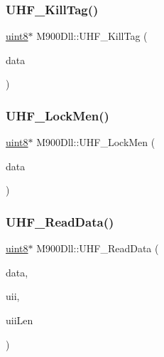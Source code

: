\subsubsection{\texorpdfstring{UHF\_KillTag()}{UHF\_KillTag()}}
{\footnotesize\ttfamily \mbox{\hyperlink{m900dll_8h_adde6aaee8457bee49c2a92621fe22b79}{uint8}}$\ast$ M900\+Dll\+::\+U\+H\+F\+\_\+\+Kill\+Tag (\begin{DoxyParamCaption}\item[{\mbox{\hyperlink{struct_u_h_f___req_kill_tag__t}{U\+H\+F\+\_\+\+Req\+Kill\+Tag\+\_\+t}} $\ast$}]{data }\end{DoxyParamCaption})}

\mbox{\label{class_m900_dll_a2966116b5f6e7a04a490d38d27251ff1}} 
\subsubsection{\texorpdfstring{UHF\_LockMen()}{UHF\_LockMen()}}
{\footnotesize\ttfamily \mbox{\hyperlink{m900dll_8h_adde6aaee8457bee49c2a92621fe22b79}{uint8}}$\ast$ M900\+Dll\+::\+U\+H\+F\+\_\+\+Lock\+Men (\begin{DoxyParamCaption}\item[{\mbox{\hyperlink{struct_u_h_f___req_lock_mem__t}{U\+H\+F\+\_\+\+Req\+Lock\+Mem\+\_\+t}} $\ast$}]{data }\end{DoxyParamCaption})}

\mbox{\label{class_m900_dll_a356133adf3ec6c2a533f8402a457c614}} 
\subsubsection{\texorpdfstring{UHF\_ReadData()}{UHF\_ReadData()}}
{\footnotesize\ttfamily \mbox{\hyperlink{m900dll_8h_adde6aaee8457bee49c2a92621fe22b79}{uint8}}$\ast$ M900\+Dll\+::\+U\+H\+F\+\_\+\+Read\+Data (\begin{DoxyParamCaption}\item[{\mbox{\hyperlink{struct_u_h_f___req_read_data__t}{U\+H\+F\+\_\+\+Req\+Read\+Data\+\_\+t}} $\ast$}]{data,  }\item[{\mbox{\hyperlink{m900dll_8h_adde6aaee8457bee49c2a92621fe22b79}{uint8}} $\ast$}]{uii,  }\item[{\mbox{\hyperlink{m900dll_8h_adde6aaee8457bee49c2a92621fe22b79}{uint8}}}]{uii\+Len }\end{DoxyParamCaption})}

